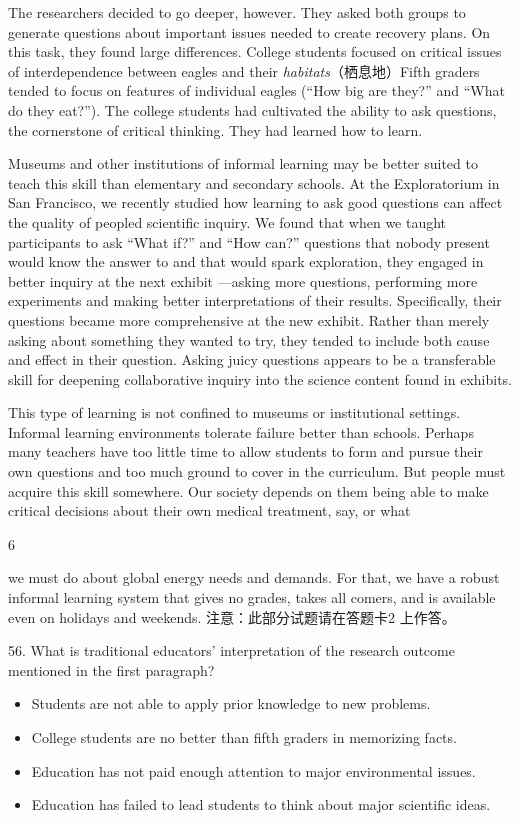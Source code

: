\documentclass[UTF8,11pt]{ctexart}
\begin{document}
The researchers decided to go deeper, however. They asked both groups to generate questions about important issues needed to create recovery plans. On this task, they found large differences. College students focused on critical issues of interdependence between eagles and their\textit{ habitats}（栖息地）Fifth graders tended to focus on features of individual eagles (“How big are they?” and “What do they eat?”). The college students had cultivated the ability to ask questions, the cornerstone of critical thinking. They had learned how to learn.


Museums and other institutions of informal learning may be better suited to teach this skill than elementary and secondary schools. At the Exploratorium in San Francisco, we recently studied how learning to ask good questions can affect the quality of peopled scientific inquiry. We found that when we taught participants to ask “What if?” and “How can?” questions that nobody present would know the answer to and that would spark exploration, they engaged in better inquiry at the next exhibit —asking more questions, performing more experiments and making better interpretations of their results. Specifically, their questions became more comprehensive at the new exhibit. Rather than merely asking about something they wanted to try, they tended to include both cause and effect in their question. Asking juicy questions appears to be a transferable skill for deepening collaborative inquiry into the science content found in exhibits.


This type of learning is not confined to museums or institutional settings. Informal learning environments tolerate failure better than schools. Perhaps many teachers have too little time to allow students to form and pursue their own questions and too much ground to cover in the curriculum. But people must acquire this skill somewhere. Our society depends on them being able to make critical decisions about their own medical treatment, say, or what


6


we must do about global energy needs and demands. For that, we have a robust informal learning system that gives no grades, takes all comers, and is available even on holidays and weekends. 注意：此部分试题请在答题卡2 上作答。


56. What is traditional educators’ interpretation of the research outcome mentioned in the first paragraph?


\begin{itemize}[leftmargin=2em,itemsep=.2em,topsep=.4em]\item[A.] Students are not able to apply prior knowledge to new problems.
\item[B.] College students are no better than fifth graders in memorizing facts.
\item[C.] Education has not paid enough attention to major environmental issues.
\item[D.] Education has failed to lead students to think about major scientific ideas.
\end{itemize}
\end{document}
